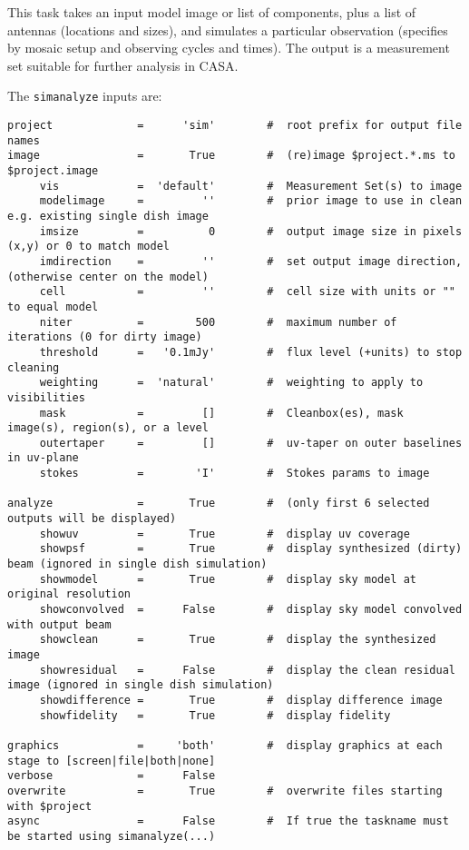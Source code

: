 This task takes an input model image or list of components, plus a
list of antennas (locations and sizes), and simulates a particular
observation (specifies by mosaic setup and observing cycles and
times).  The output is a measurement set suitable for further analysis in CASA.

The {\tt simanalyze} inputs are:
\small
\begin{verbatim}
project             =      'sim'        #  root prefix for output file names
image               =       True        #  (re)image $project.*.ms to $project.image
     vis            =  'default'        #  Measurement Set(s) to image
     modelimage     =         ''        #  prior image to use in clean e.g. existing single dish image
     imsize         =          0        #  output image size in pixels (x,y) or 0 to match model
     imdirection    =         ''        #  set output image direction, (otherwise center on the model)
     cell           =         ''        #  cell size with units or "" to equal model
     niter          =        500        #  maximum number of iterations (0 for dirty image)
     threshold      =   '0.1mJy'        #  flux level (+units) to stop cleaning
     weighting      =  'natural'        #  weighting to apply to visibilities
     mask           =         []        #  Cleanbox(es), mask image(s), region(s), or a level
     outertaper     =         []        #  uv-taper on outer baselines in uv-plane
     stokes         =        'I'        #  Stokes params to image

analyze             =       True        #  (only first 6 selected outputs will be displayed)
     showuv         =       True        #  display uv coverage
     showpsf        =       True        #  display synthesized (dirty) beam (ignored in single dish simulation)
     showmodel      =       True        #  display sky model at original resolution
     showconvolved  =      False        #  display sky model convolved with output beam
     showclean      =       True        #  display the synthesized image
     showresidual   =      False        #  display the clean residual image (ignored in single dish simulation)
     showdifference =       True        #  display difference image
     showfidelity   =       True        #  display fidelity

graphics            =     'both'        #  display graphics at each stage to [screen|file|both|none]
verbose             =      False        
overwrite           =       True        #  overwrite files starting with $project
async               =      False        #  If true the taskname must be started using simanalyze(...)
\end{verbatim}
\normalsize

